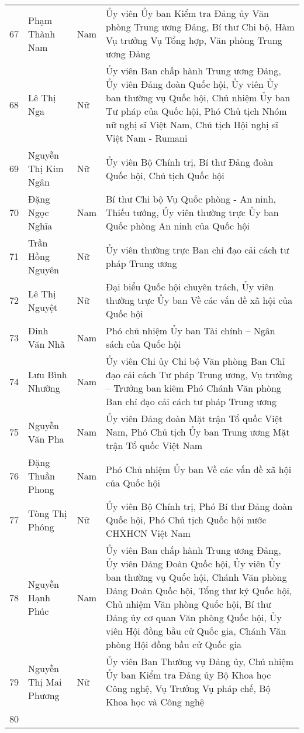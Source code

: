 \begin{longtable}{p{}p{}p{}p{}}
67 &
  Phạm Thành Nam &
  Nam &
  Ủy viên Ủy ban Kiểm tra Đảng ủy Văn phòng Trung ương Đảng, Bí thư Chi bộ, Hàm Vụ trưởng Vụ Tổng hợp, Văn phòng Trung ương Đảng \\
68 &
  Lê Thị Nga &
  Nữ &
  Ủy viên Ban chấp hành Trung ương Đảng, Ủy viên Đảng đoàn Quốc hội, Ủy viên Ủy ban thường vụ Quốc hội, Chủ nhiệm Ủy ban Tư pháp của Quốc hội, Phó Chủ tịch Nhóm nữ nghị sĩ Việt Nam, Chủ tịch Hội nghị sĩ Việt Nam - Rumani \\
69 &
  Nguyễn Thị Kim Ngân &
  Nữ &
  Ủy viên Bộ Chính trị, Bí thư Đảng đoàn Quốc hội, Chủ tịch Quốc hội \\
70 &
  Đặng Ngọc Nghĩa &
  Nam &
  Bí thư Chi bộ Vụ Quốc phòng - An ninh, Thiếu tướng, Ủy viên thường trực Ủy ban Quốc phòng An ninh của Quốc hội \\
71 &
  Trần Hồng Nguyên &
  Nữ &
  Ủy viên thường trực Ban chỉ đạo cải cách tư pháp Trung ương \\
72 &
  Lê Thị Nguyệt &
  Nữ &
  Đại biểu Quốc hội chuyên trách, Ủy viên thường trực Ủy ban Về các vấn đề xã hội của Quốc hội \\
73 &
  Đinh Văn Nhã &
  Nam &
  Phó chủ nhiệm Ủy ban Tài chính – Ngân sách của Quốc hội \\
74 &
  Lưu Bình Nhưỡng &
  Nam &
  Ủy viên Chi ủy Chi bộ Văn phòng Ban Chỉ đạo cải cách Tư pháp Trung ương, Vụ trưởng – Trưởng ban kiêm Phó Chánh Văn phòng Ban chỉ đạo cải cách tư pháp Trung ương \\
75 &
  Nguyễn Văn Pha &
  Nam &
  Ủy viên Đảng đoàn Mặt trận Tổ quốc Việt Nam, Phó Chủ tịch Ủy ban Trung ương Mặt trận Tổ quốc Việt Nam \\
76 &
  Đặng Thuần Phong &
  Nam &
  Phó Chủ nhiệm Ủy ban Về các vấn đề xã hội của Quốc hội \\
77 &
  Tòng Thị Phóng &
  Nữ &
  Ủy viên Bộ Chính trị, Phó Bí thư Đảng đoàn Quốc hội, Phó Chủ tịch Quốc hội nước CHXHCN Việt Nam \\
78 &
  Nguyễn Hạnh Phúc &
  Nam &
  Ủy viên Ban chấp hành Trung ương Đảng, Ủy viên Đảng Đoàn Quốc hội, Ủy viên Ủy ban thường vụ Quốc hội, Chánh Văn phòng Đảng Đoàn Quốc hội, Tổng thư ký Quốc hội, Chủ nhiệm Văn phòng Quốc hội, Bí thư Đảng ủy cơ quan Văn phòng Quốc hội, Ủy viên Hội đồng bầu cử Quốc gia, Chánh Văn phòng Hội đồng bầu cử Quốc gia \\
79 &
  Nguyễn Thị Mai Phương &
  Nữ &
  Ủy viên Ban Thường vụ Đảng ủy, Chủ nhiệm Ủy ban Kiểm tra Đảng ủy Bộ Khoa học Công nghệ, Vụ Trưởng Vụ pháp chế, Bộ Khoa học và Công nghệ \\
80 &

\end{longtable}
